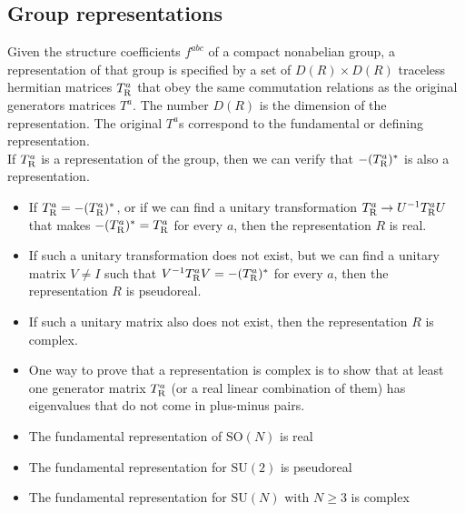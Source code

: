 \subsection{Group representations}
Given the structure coefficients $f^{abc}$ of a compact nonabelian group, a representation of that group is specified by a set of $D(R)\times D(R)$ traceless hermitian matrices $T^a_{\rm R}$ that obey the same commutation relations as the original generators matrices $T^a$.
The number $D(R)$ is the dimension of the representation. The original $T^a$s correspond to the fundamental or defining representation.
\\
If $T^a_{\rm R}$ is a representation of the group, then we can verify that  $-(T^a_{\rm R})^*$ is also a representation. 
\begin{itemize}
\item If $T^a_{\rm R} = -(T^a_{\rm R})^*$, or if we can find a unitary transformation $T^a_{\rm R} \to U^{-1}T^a_{\rm R}U$ that makes $-(T^a_{\rm R})^* = T^a_{\rm R}$ for every $a$, then the representation $R$ is real.
\item If such a unitary transformation does not exist, but we can find a unitary matrix $V \neq I$ such that $V^{-1}T^a_{\rm R}V = -(T^a_{\rm R})^*$ for every $a$, then the representation $R$ is pseudoreal.
\item If such a unitary matrix also does not exist, then the representation $R$ is complex.
\item One way to prove that a representation is complex is to show that at least one generator matrix $T^a_{\rm R}$ (or a real linear combination of them) has eigenvalues that do not come in plus-minus pairs.
\end{itemize}

\begin{example}
\begin{itemize}
\item The fundamental representation of $\mathrm{SO}(N)$ is real
\item The fundamental representation for $\mathrm{SU}(2)$ is pseudoreal
\item The fundamental representation for $\mathrm{SU}(N)$ with $N \geq 3$ is complex
\end{itemize}
\end{example}

